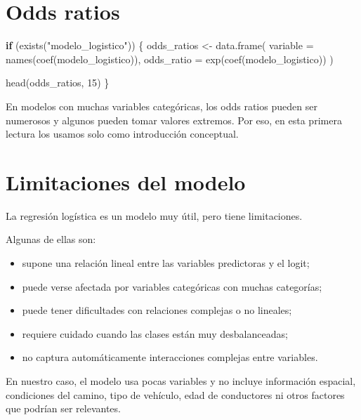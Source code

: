 \documentclass[
  11pt,
  letterpaper,
]{book}
\newenvironment{Shaded}{\begin{snugshade}}{\end{snugshade}}
\newcommand{\AttributeTok}[1]{\textcolor[rgb]{0.40,0.45,0.13}{#1}}
\newcommand{\ControlFlowTok}[1]{\textcolor[rgb]{0.00,0.23,0.31}{\textbf{#1}}}
\newcommand{\DecValTok}[1]{\textcolor[rgb]{0.68,0.00,0.00}{#1}}
\newcommand{\FunctionTok}[1]{\textcolor[rgb]{0.28,0.35,0.67}{#1}}
\newcommand{\NormalTok}[1]{\textcolor[rgb]{0.00,0.23,0.31}{#1}}
\newcommand{\OtherTok}[1]{\textcolor[rgb]{0.00,0.23,0.31}{#1}}
\newcommand{\StringTok}[1]{\textcolor[rgb]{0.13,0.47,0.30}{#1}}
\providecommand{\tightlist}{%
  \setlength{\itemsep}{0pt}\setlength{\parskip}{0pt}}
\begin{document}
\section{Odds ratios}\label{odds-ratios}

\begin{Shaded}
\begin{Highlighting}[]
\ControlFlowTok{if}\NormalTok{ (}\FunctionTok{exists}\NormalTok{(}\StringTok{"modelo\_logistico"}\NormalTok{)) \{}
\NormalTok{  odds\_ratios }\OtherTok{\textless{}{-}} \FunctionTok{data.frame}\NormalTok{(}
    \AttributeTok{variable =} \FunctionTok{names}\NormalTok{(}\FunctionTok{coef}\NormalTok{(modelo\_logistico)),}
    \AttributeTok{odds\_ratio =} \FunctionTok{exp}\NormalTok{(}\FunctionTok{coef}\NormalTok{(modelo\_logistico))}
\NormalTok{  )}

  \FunctionTok{head}\NormalTok{(odds\_ratios, }\DecValTok{15}\NormalTok{)}
\NormalTok{\}}
\end{Highlighting}
\end{Shaded}

En modelos con muchas variables categóricas, los odds ratios pueden ser
numerosos y algunos pueden tomar valores extremos. Por eso, en esta
primera lectura los usamos solo como introducción conceptual.

\section{Limitaciones del modelo}\label{limitaciones-del-modelo}

La regresión logística es un modelo muy útil, pero tiene limitaciones.

Algunas de ellas son:

\begin{itemize}
\tightlist
\item
  supone una relación lineal entre las variables predictoras y el logit;
\item
  puede verse afectada por variables categóricas con muchas categorías;
\item
  puede tener dificultades con relaciones complejas o no lineales;
\item
  requiere cuidado cuando las clases están muy desbalanceadas;
\item
  no captura automáticamente interacciones complejas entre variables.
\end{itemize}

En nuestro caso, el modelo usa pocas variables y no incluye información
espacial, condiciones del camino, tipo de vehículo, edad de conductores
ni otros factores que podrían ser relevantes.
\end{document}
